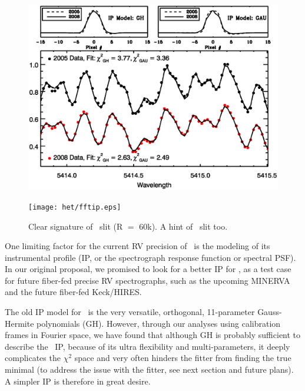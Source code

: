 \begin{figure}
\centering
\includegraphics[scale=0.45]{het/iodfit.eps}
\caption{
\label{het:fig:ghgau}}
\end{figure}




\begin{figure}
\centering
\texttt{[image: het/fftip.eps]}
\caption{Clear signature of \het\ slit (R $=$ 60k). A hint of \keck\
  slit too.
\label{het:fig:fftip}}
\end{figure}


One limiting factor for the current RV precision of \hrs\ is the
modeling of its instrumental profile (IP, or the spectrograph response
function or spectral PSF). In our original proposal, we promised to
look for a better IP for \hrs, as a test case for future fiber-fed
precise RV spectrographs, such as the upcoming MINERVA and the future
fiber-fed Keck/HIRES.

The old IP model for \hrs\ is the very versatile, orthogonal,
11-parameter Gauss-Hermite polynomials (GH). However, through our
analyses using calibration frames in Fourier space, we have found that
although GH is probably sufficient to describe the \hrs\ IP, because
of its ultra flexibility and multi-parameters, it deeply complicates
the $\chi^2$ space and very often hinders the fitter from finding the
true minimal (to address the issue with the fitter, see next section
and future plans). A simpler IP is therefore in great desire.


